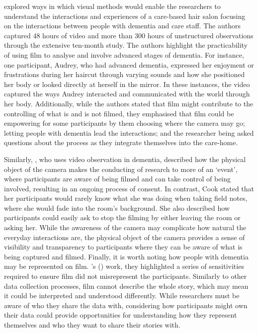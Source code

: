 \cite{campbell2017video} explored ways in which visual methods would enable the researchers to understand the interactions and experiences of a care-based hair salon focusing on the interactions between people with dementia and care staff. The authors captured 48 hours of video and more than 300 hours of unstructured observations through the extensive ten-month study. The authors highlight the practicability of using film to analyse and involve advanced stages of dementia. For instance, one participant, Audrey, who had advanced dementia, expressed her enjoyment or frustrations during her haircut through varying sounds and how she positioned her body or looked directly at herself in the mirror. In these instances, the video captured the ways Audrey interacted and communicated with the world through her body. Additionally, while the authors stated that film might contribute to the controlling of what is and is not filmed, they emphasised that film could be empowering for some participants by them choosing where the camera may go; letting people with dementia lead the interactions; and the researcher being asked questions about the process as they integrate themselves into the care-home. 

Similarly, \cite{cook2002using}, who uses video observation in dementia, described how the physical object of the camera makes the conducting of research to more of an `event', where participants are aware of being filmed and can take control of being involved, resulting in an ongoing process of consent. In contrast, Cook stated that her participants would rarely know what she was doing when taking field notes, where she would fade into the room's background. She also described how participants could easily ask to stop the filming by either leaving the room or asking her. While the awareness of the camera may complicate how natural the everyday interactions are, the physical object of the camera provides a sense of visibility and transparency to participants where they can be aware of what is being captured and filmed. Finally, it is worth noting how people with dementia may be represented on film. \citeauthor{campbell2017video}'s (\citeyear{campbell2017video}) work, they highlighted a series of sensitivities required to ensure film did not misrepresent the participants. Similarly to other data collection processes, film cannot describe the whole story, which may mean it could be interpreted and understood differently. While researchers must be aware of who they share the data with, considering how participants might own their data could provide opportunities for understanding how they represent themselves and who they want to share their stories with.

